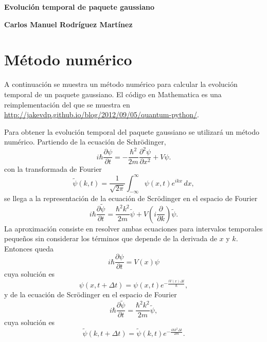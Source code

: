 \documentclass[letterpaper,11pt]{article}
\begin{document}
\begin{center}
{\bf \Large Evolución temporal de paquete gaussiano} 
\end{center}

\noindent
{\bf \large Carlos Manuel Rodríguez Martínez} \hspace{5.2cm}

\smallskip


\section{Método numérico}
A continuación se muestra un método numérico para calcular la evolución temporal de un paquete gaussiano. El código en Mathematica es una reimplementación del que se muestra en \url{http://jakevdp.github.io/blog/2012/09/05/quantum-python/}.

Para obtener la evolución temporal del paquete gaussiano se utilizará un método numérico. Partiendo de la ecuación de Schrödinger,
\[
	i \hbar \frac{\partial \psi}{\partial t} = - \frac{\hbar^2}{2 m} \frac{\partial^2 \psi}{\partial x^2} + V \psi.
\]
con la transformada de Fourier
\[
	\tilde{\psi} (k,t) = \frac{1}{\sqrt{2 \pi}} \int_{-\infty}^\infty \psi(x,t) e^{i k x} \, dx,
\]
se llega a la representación de la ecuación de Scrödinger en el espacio de Fourier
\[
	i \hbar \frac{\partial \tilde{\psi}}{\partial t} = \frac{\hbar^2 k^2}{2m} \tilde{\psi} + V \left( i \frac{\partial}{\partial k} \right) \tilde{\psi}.
\]
La aproximación consiste en resolver ambas ecuaciones para intervalos temporales pequeños sin considerar los términos que depende de la derivada de $x$ y $k$. Entonces queda
\[
	i \hbar \frac{\partial \psi}{\partial t} = V(x) \psi
\]
cuya solución es
\[
	\psi(x, t + \Delta t) = \psi(x,t) e^{- \frac{i V(x) \Delta t}{\hbar}},
\]
y de la ecuación de Scrödinger en el espacio de Fourier
\[
	i \hbar \frac{\partial \tilde{\psi}}{\partial t} = \frac{\hbar^2 k^2}{2 m} \tilde{\psi},
\]
cuya solución es
\[
	\tilde{\psi}(k, t+\Delta t) = \tilde{\psi}(k, t) e^{- \frac{i \hbar k^2 \Delta t}{2 m}}.
\]
\end{document}
